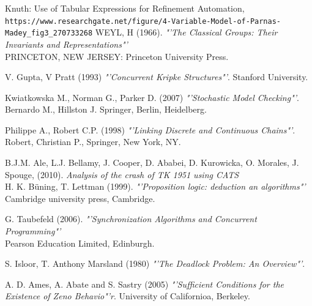 \documentclass{article}%
\begin{document}
\clearpage  %





\begin{thebibliography}{9}


Knuth: Use of Tabular Expressions for Refinement Automation,
\\\texttt{https://www.researchgate.net/figure/4-Variable-Model-of-Parnas-Madey\_fig3\_270733268}
WEYL, H (1966).
\textit{"'The Classical Groups: Their Invariants and Representations"'}\\ 
PRINCETON, NEW JERSEY: Princeton University Press.

V. Gupta, V Pratt (1993)
\textit{"'Concurrent Kripke Structures"'}. 
Stanford University.

Kwiatkowska M., Norman G., Parker D. (2007)
\textit{"'Stochastic Model Checking"'}. 
Bernardo M., Hillston J. Springer, Berlin, Heidelberg.

Philippe A., Robert C.P. (1998)  
\textit{"'Linking Discrete and Continuous Chains"'}. 
Robert, Christian P., Springer, New York, NY.

B.J.M. Ale, L.J. Bellamy, J. Cooper, D. Ababei, D. Kurowicka, O. Morales, J. Spouge, (2010).
\textit{Analysis of the crash of TK 1951 using CATS}\\

H. K. Büning, T. Lettman (1999).
\textit{"'Proposition logic: deduction an algorithms"'}\\
Cambridge university press, Cambridge. 

G. Taubefeld (2006).
\textit{"'Synchronization Algorithms and Concurrent Programming"'}\\
Pearson Education Limited, Edinburgh. 

S. Isloor, T. Anthony Marsland (1980)
\textit{"'The Deadlock Problem: An Overview"'}. 

A. D. Ames, A. Abate and S. Sastry (2005)
\textit{"'Sufficient Conditions for the Existence of Zeno Behavio"'r}.
University of Californioa, Berkeley.


\end{thebibliography}
\end{document}
